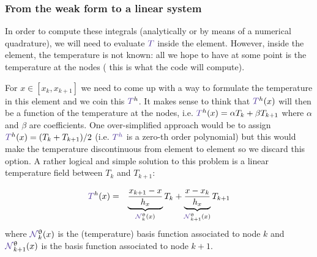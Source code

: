 \subsubsection{From the weak form to a linear system}

In order to compute these integrals (analytically or by means of a numerical quadrature), 
we will need to evaluate ${\color{Violet}T}$ inside the element. However, inside the element, 
the temperature is not known: all we hope to have at some point is the temperature at the nodes (
this is what the code will compute). 

For $x\in [x_k,x_{k+1}]$ we need to come up with a way to formulate the temperature in this element and 
we coin this ${\color{Violet}T}^h$.  
It makes sense to think that ${\color{Violet}T}^h(x)$ will then be a function of the temperature at the nodes, 
i.e. ${\color{Violet}T}^h(x) = \alpha T_k + \beta T_{k+1}$ where $\alpha$ and $\beta$ are coefficients. 
One over-simplified approach would be to assign ${\color{Violet}T}^h(x)=(T_k + T_{k+1})/2$ 
(i.e. ${\color{Violet}T^h}$ is a zero-th order polynomial) but this would make the
temperature discontinuous from element to element so we discard this option. 
A rather logical and simple solution to this problem is a linear temperature field between $T_k$
and $T_{k+1}$: 

\begin{eqnarray}
{\color{Violet}T}^h(x) 
&=& \underbrace{\frac{x_{k+1}-x}{h_x}}_{{\color{Violet}\bN}_k^\uptheta(x)} T_k 
+ 
\underbrace{\frac{x-x_k}{h_x}}_{{\color{Violet}\bN}_{k+1}^\uptheta(x)} T_{k+1} \nn
\end{eqnarray}
where ${\color{Violet}\bN}_k^\uptheta(x)$ is the (temperature) basis function associated to node $k$ and 
${\color{Violet}\bN}_{k+1}^\uptheta(x)$ is the basis function associated to node $k+1$.

